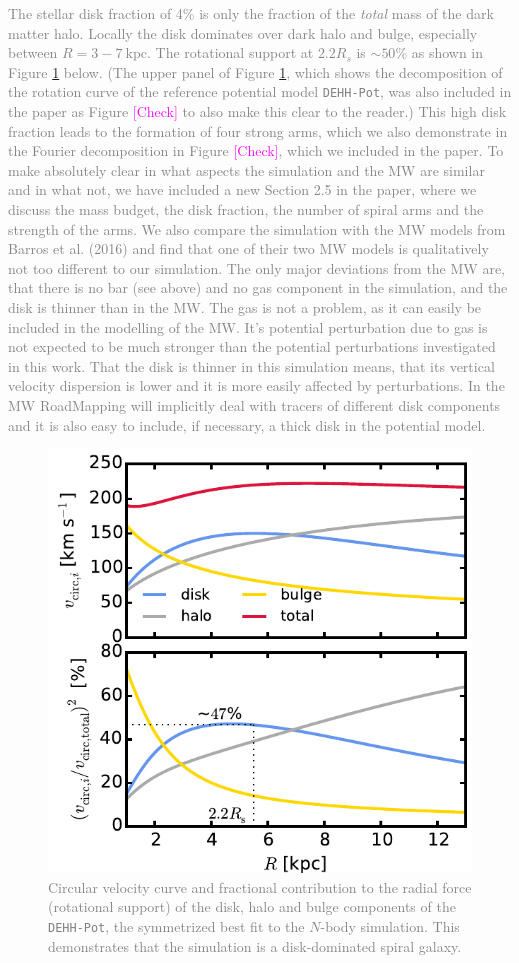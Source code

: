 \documentclass[10pt,a4paper]{article}
\newcommand{\Wilma}[1]{\textcolor{Magenta}{#1}}
\newcommand{\Answer}[1]{\textcolor{Gray}{#1}}
\begin{document}
\Answer{The stellar disk fraction of 4\% is only the fraction of the \emph{total} mass of the dark matter halo. Locally the disk dominates over dark halo and bulge, especially between $R=3-7~\text{kpc}$. The rotational support at $2.2R_s$ is $\sim50\%$ as shown in Figure \ref{fig:rot_support} below. (The upper panel of Figure \ref{fig:rot_support}, which shows the decomposition of the rotation curve of the reference potential model \texttt{DEHH-Pot}, was also included in the paper as Figure \Wilma{[Check]} to also make this clear to the reader.) This high disk fraction leads to the formation of four strong arms, which we also demonstrate in the Fourier decomposition in Figure \Wilma{[Check]}, which we included in the paper. To make absolutely clear in what aspects the simulation and the MW are similar and in what not, we have included a new Section 2.5 in the paper, where we discuss the mass budget, the disk fraction, the number of spiral arms and the strength of the arms. We also compare the simulation with the MW models from Barros et al. (2016) and find that one of their two MW models is qualitatively not too different to our simulation. The only major deviations from the MW are, that there is no bar (see above) and no gas component in the simulation, and the disk is thinner than in the MW. The gas is not a problem, as it can easily be included in the modelling of the MW. It's potential perturbation due to gas is not expected to be much stronger than the potential perturbations investigated in this work. That the disk is thinner in this simulation means, that its vertical velocity dispersion is lower and it is more easily affected by perturbations. In the MW RoadMapping will implicitly deal with tracers of different disk components and it is also easy to include, if necessary, a thick disk in the potential model.}

\begin{figure}[!htbp]
\centering
\includegraphics[width=0.7\columnwidth]{fig/plot_vcirc_decomposed.pdf}
\caption{\Answer{Circular velocity curve and fractional contribution to the radial force (rotational support) of the disk, halo and bulge components of the \texttt{DEHH-Pot}, the symmetrized best fit to the $N$-body simulation. This demonstrates that the simulation is a disk-dominated spiral galaxy.}}
\label{fig:rot_support}
\end{figure}
\end{document}
